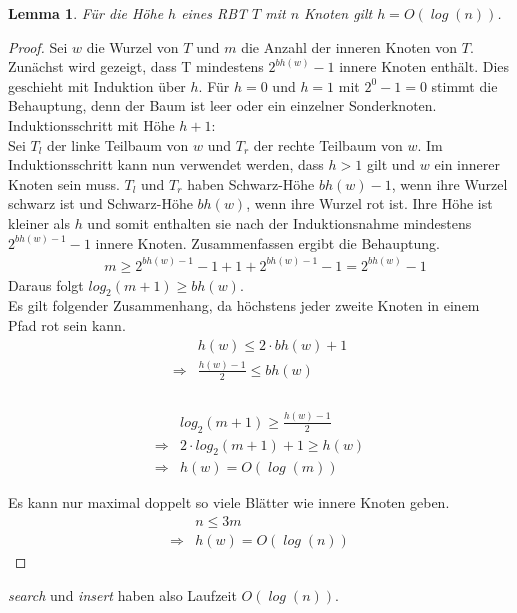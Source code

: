 \documentclass[a4paper,12pt]{article}
\newtheorem{Lemma}{Lemma}[section]
\begin{document}
\begin{Lemma} Für die Höhe $h$ eines RBT $T$ mit $n$ Knoten gilt $h = \mathit{O\left(\log \left(n\right)\right)}$. 
\end{Lemma}
\begin{proof}
	Sei $w$ die Wurzel von $T$ und $m$ die Anzahl der inneren Knoten von $T$. 
	Zunächst wird gezeigt, dass T mindestens $2^\mathit{bh(w)} - 1$ innere Knoten enthält.
	Dies geschieht mit Induktion über $h$. Für $h = 0$ und  $h = 1$ mit $2^0 - 1 = 0 $ stimmt die Behauptung, denn der Baum ist leer oder ein einzelner Sonderknoten. \\ 
	Induktionsschritt mit Höhe $h + 1$:\\
	Sei $T_l$ der linke Teilbaum von $w$ und $T_r$ der rechte Teilbaum von $w$.  
	Im Induktionsschritt kann nun verwendet werden, dass $h > 1$ gilt und $w$ ein innerer Knoten sein muss. $T_l$ und $T_r$ haben Schwarz-Höhe $\mathit{bh(w)} - 1$, wenn ihre Wurzel schwarz ist und Schwarz-Höhe $\mathit{bh(w)}$, wenn ihre Wurzel rot ist. Ihre Höhe ist kleiner als $h$ und somit enthalten sie nach der Induktionsnahme mindestens  $2^\mathit{bh(w)- 1} - 1$ innere Knoten. Zusammenfassen ergibt die Behauptung.\\    
	\begin{align*}
	&m \geq 2^\mathit{bh(w)- 1} - 1  + 1  + 2^\mathit{bh(w)- 1} - 1 = 2^\mathit{bh(w)} - 1
	\end{align*}
	Daraus folgt $log_2(m + 1) \geq\mathit{bh(w)}$.\\
    Es gilt folgender Zusammenhang, da höchstens jeder zweite Knoten in einem Pfad rot sein kann.\\
	\begin{align*}
	&\mathit{h(w)} \leq 2 \cdot \mathit{bh(w) } + 1 \\
	\Rightarrow &\frac{\mathit{h(w)} - 1}{2} \leq\mathit{bh(w) } \\
	\end{align*}
	\\
	\begin{align*}
	&log_2(m + 1) \geq\frac{\mathit{h(w)} - 1}{2} \\
	\Rightarrow	&2 \cdot log_2(m + 1) + 1 \geq\mathit{h(w)} \\
	\Rightarrow &\mathit{h(w)} = \mathit{O\left(\log \left( {m}\right)\right)} 
	\end{align*}
	
	
	
	
	
	
	\noindent Es kann nur maximal doppelt so viele Blätter wie innere Knoten geben.
	\begin{align*}
	&n  \leq 3 m \\
	\Rightarrow &\mathit{h(w)} = \mathit{O\left(\log \left({n}\right)\right)} 
	\end{align*} 
	
	
\end{proof}
\noindent \textit{search} und \textit{insert} haben also Laufzeit $\mathit{O\left(\log \left({n}\right)\right)}$.
\end{document}
